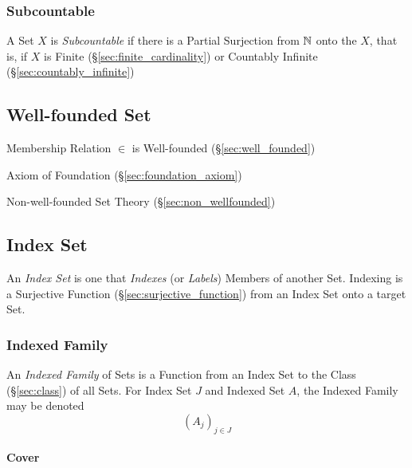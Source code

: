 \subsubsection{Subcountable}\label{sec:subcountable}

A Set $X$ is \emph{Subcountable} if there is a Partial Surjection from
$\mathbb{N}$ onto the $X$, that is, if $X$ is Finite
(\S\ref{sec:finite_cardinality}) or Countably Infinite
(\S\ref{sec:countably_infinite})



\subsection{Well-founded Set}\label{sec:wellfounded_set}

Membership Relation $\in$ is Well-founded (\S\ref{sec:well_founded})

Axiom of Foundation (\S\ref{sec:foundation_axiom})

Non-well-founded Set Theory (\S\ref{sec:non_wellfounded})



\subsection{Index Set}\label{sec:index_set}

An \emph{Index Set} is one that \emph{Indexes} (or \emph{Labels})
Members of another Set. Indexing is a Surjective Function
(\S\ref{sec:surjective_function}) from an Index Set onto a target Set.



\subsubsection{Indexed Family}\label{sec:indexed_family}

An \emph{Indexed Family} of Sets is a Function from an Index Set to
the Class (\S\ref{sec:class}) of all Sets. For Index Set $J$ and
Indexed Set $A$, the Indexed Family may be denoted
\[
  (A_j)_{j \in J}
\]



\paragraph{Cover}\label{sec:cover}\hfill


